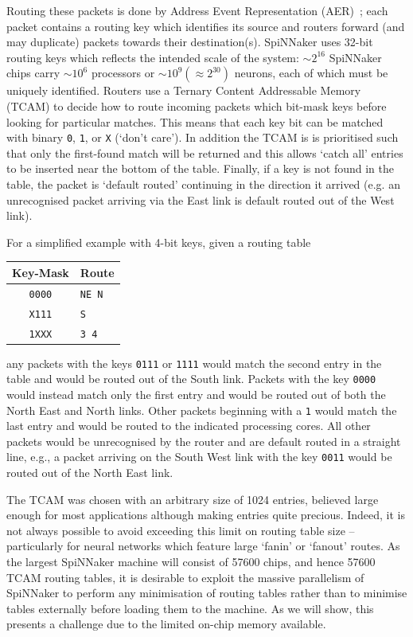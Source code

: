 \documentclass[conference]{IEEEtran}
\newcommand{\mytt}[1]{\texttt{\footnotesize#1}}
\begin{document}
Routing these packets is done by Address Event Representation (AER)~\parencite{Boahen2000}; each packet contains a routing key which identifies its source and routers forward (and may duplicate) packets towards their destination(s).
SpiNNaker uses 32-bit routing keys which reflects the intended scale of the system: $\sim2^{16}$ SpiNNaker chips carry $\sim10^6$ processors or $\sim10^9 (\approx 2^{30})$ neurons, each of which must be uniquely identified.
Routers use a Ternary Content Addressable Memory (TCAM) to decide how to route incoming packets which bit-mask keys before looking for particular matches.
This means that each key bit can be matched with binary \mytt{0}, \mytt{1}, or \mytt{X} (`don't care').
In addition the TCAM is is prioritised such that only the first-found match will be returned and this allows `catch all' entries to be inserted near the bottom of the table.
Finally, if a key is not found in the table, the packet is `default routed' continuing in the direction it arrived (e.g. an unrecognised packet arriving via the East link is default routed out of the West link).

For a simplified example with 4-bit keys, given a routing table

\begin{table}[H]
  \centering
  \begin{tabular}{c l}
    \toprule
    Key-Mask & Route \\
    \midrule
    \texttt{0000} & \texttt{NE N}\\
    \texttt{X111} & \texttt{S}\\
    \texttt{1XXX} & \texttt{3 4}\\
    \bottomrule
  \end{tabular}
\end{table}

\noindent any packets with the keys \mytt{0111} or \mytt{1111} would match the second entry in the table and would be routed out of the South link.
Packets with the key \mytt{0000} would instead match only the first entry and would be routed out of both the North East and North links.
Other packets beginning with a \mytt{1} would match the last entry and would be routed to the indicated processing cores.
All other packets would be unrecognised by the router and are default routed in a straight line, e.g., a packet arriving on the South West link with the key \mytt{0011} would be routed out of the North East link.

The TCAM was chosen with an arbitrary size of 1024 entries, believed large enough for most applications although making entries quite precious.
Indeed, it is not always possible to avoid exceeding this limit on routing table size -- particularly for neural networks which feature large `fanin' or `fanout' routes.
As the largest SpiNNaker machine will consist of \num{57600} chips, and hence \num{57600} TCAM routing tables, it is desirable to exploit the massive parallelism of SpiNNaker to perform any minimisation of routing tables rather than to minimise tables externally before loading them to the machine. As we will show, this presents a challenge due to the limited on-chip memory available.
\end{document}
